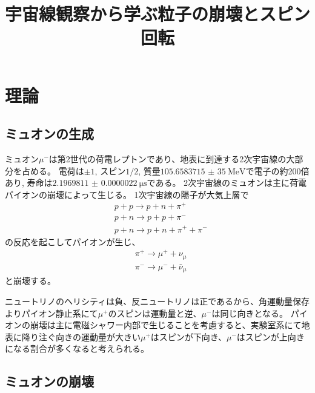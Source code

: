 \documentclass[dvipdfmx]{jsarticle}
\title{宇宙線観察から学ぶ粒子の崩壊とスピン回転
}
\begin{document}
\maketitle

\section{理論}

\subsection{ミュオンの生成}
\label{sec: theory: generation of muon}

ミュオン$\mu^-$は第2世代の荷電レプトンであり、地表に到達する2次宇宙線の大部分を占める。
電荷は$\pm1$, スピン$1/2$, 質量$\SI[]{105.658 3715(35)}[]{\MeV}$で電子の約200倍あり, 寿命は$\SI{2.1969811(22)}{\micro\second}$である。
2次宇宙線のミュオンは主に荷電パイオンの崩壊によって生じる。
1次宇宙線の陽子が大気上層で
\begin{align*}
    &p+p\to p+n+\pi^+
    \\
    &p+n\to p+p+\pi^-
    \\
    &p+n\to p+n+\pi^++\pi^-
\end{align*}
の反応を起こしてパイオンが生じ、
\begin{align*}
    &\pi^+\to\mu^++\nu_\mu
    \\
    &\pi^-\to\mu^-+\bar{\nu}_\mu
\end{align*}
と崩壊する。

ニュートリノのヘリシティは負、反ニュートリノは正であるから、角運動量保存よりパイオン静止系にて$\mu^+$のスピンは運動量と逆、$\mu^-$は同じ向きとなる。
パイオンの崩壊は主に電磁シャワー内部で生じることを考慮すると、実験室系にて地表に降り注ぐ向きの運動量が大きい$\mu^+$はスピンが下向き、$\mu^-$はスピンが上向きになる割合が多くなると考えられる。


\subsection{ミュオンの崩壊}
\label{sec: theory: decay of muon}
\end{document}
